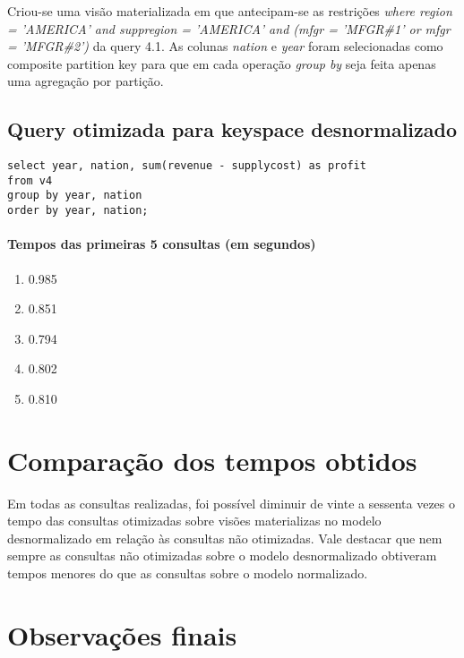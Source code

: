 \documentclass[12pt]{article}
\begin{document}
Criou-se uma visão materializada em que antecipam-se as restrições \emph{where region = 'AMERICA' and suppregion = 'AMERICA' and (mfgr = 'MFGR\#1' or mfgr = 'MFGR\#2')} da query 4.1. As colunas \emph{nation} e \emph{year} foram selecionadas como composite partition key para que em cada operação \emph{group by} seja feita apenas uma agregação por partição.

\subsection{Query otimizada para keyspace desnormalizado}

\begin{lstlisting}
select year, nation, sum(revenue - supplycost) as profit 
from v4
group by year, nation
order by year, nation;
\end{lstlisting}

\paragraph{Tempos das primeiras 5 consultas (em segundos)}
\begin{enumerate}
\item 0.985
\item 0.851
\item 0.794
\item 0.802
\item 0.810
\end{enumerate}

\section{Comparação dos tempos obtidos}

Em todas as consultas realizadas, foi possível diminuir de vinte a sessenta vezes o tempo das consultas otimizadas sobre visões materializas no modelo desnormalizado em relação às consultas não otimizadas. Vale destacar que nem sempre as consultas não otimizadas sobre o modelo desnormalizado obtiveram tempos menores do que as consultas sobre o modelo normalizado.

\section{Observações finais}
\end{document}
